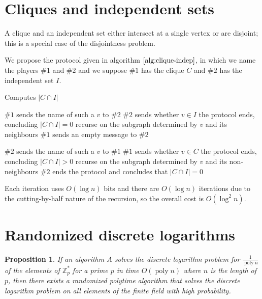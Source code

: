\documentclass[letterpaper,11pt]{article}
\newtheorem{prop}{Proposition}
\DeclareMathOperator{\poly}{poly}
\newcommand{\Z}{\mathbb{Z}}
\begin{document}
\section{Cliques and independent sets}

A clique and an independent set either intersect at a single vertex or are
disjoint; this is a special case of the disjointness problem.

We propose the protocol given in algorithm $\ref{alg:clique-indep}$, in which
we name the players $\#1$ and $\#2$ and we suppose $\#1$ has the clique $C$ and
$\#2$ has the independent set $I$.

\begin{algorithm}
    \caption{Computes $|C \cap I|$}
    \begin{algorithmic}
            \State $\#1$ sends the name of such a $v$ to $\#2$
            \State $\#2$ sends whether $v \in I$
                \State the protocol ends, concluding $|C \cap I| = 0$
            \Else
                \State recurse on the subgraph determined by $v$ and its
                neighbours
            \EndIf
        \Else
            \State $\#1$ sends an empty message to $\#2$
        \EndIf

            \State $\#2$ sends the name of such a $v$ to $\#1$
            \State $\#1$ sends whether $v \in C$
                \State the protocol ends, concluding $|C \cap I| > 0$
            \Else
                \State recurse on the subgraph determined by $v$ and its
                non-neighbours
            \EndIf
        \Else
            \State $\#2$ ends the protocol and concludes that $|C \cap I| = 0$
        \EndIf
    \end{algorithmic}
    \label{alg:clique-indep}
\end{algorithm}

Each iteration uses $O(\log n)$ bits and there are $O(\log n)$ iterations due
to the cutting-by-half nature of the recursion, so the overall cost is
$O(\log^2 n)$.

\section{Randomized discrete logarithms}

\begin{prop}
    If an algorithm $A$ solves the discrete logarithm problem for
    $\frac{1}{\poly{n}}$ of the elements of $\Z_p^*$ for a prime $p$ in time
    $O(\poly n)$ where $n$ is the length of $p$, then there exists a randomized
    polytime algorithm that solves the discrete logarithm problem on all
    elements of the finite field with high probability.
\end{prop}
\end{document}

